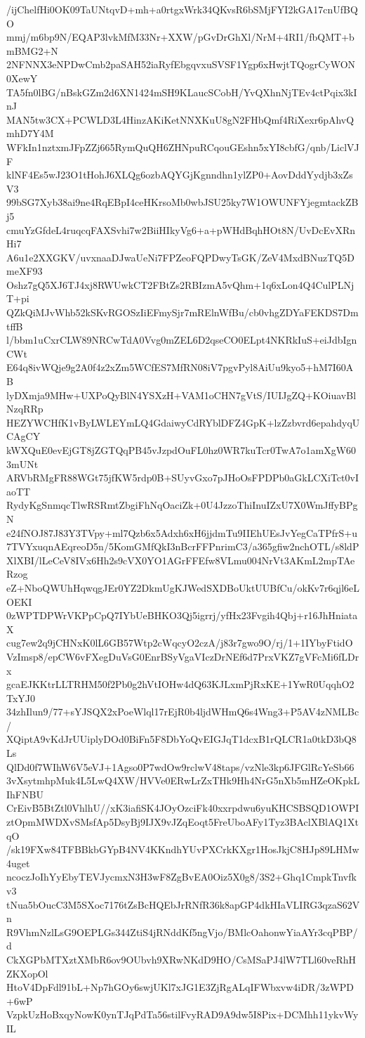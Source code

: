 /ijChelfHi0OK09TaUNtqvD+mh+a0rtgxWrk34QKvsR6bSMjFYI2kGA17cnUfBQO
mmj/m6bp9N/EQAP3lvkMfM33Nr+XXW/pGvDrGhXl/NrM+4RI1/fbQMT+bmBMG2+N
2NFNNX3eNPDwCmb2paSAH52iaRyfEbgqvxuSVSF1Ygp6xHwjtTQogrCyWON0XewY
TA5fn0lBG/nBskGZm2d6XN1424mSH9KLaucSCobH/YvQXhnNjTEv4ctPqix3kInJ
MAN5tw3CX+PCWLD3L4HinzAKiKetNNXKuU8gN2FHbQmf4RiXexr6pAhvQmhD7Y4M
WFkIn1nztxmJFpZZj665RymQuQH6ZHNpuRCqouGEshn5xYI8cbfG/qnb/LiclVJF
klNF4Es5wJ23O1tHohJ6XLQg6ozbAQYGjKgnndhn1ylZP0+AovDddYydjb3xZsV3
99bSG7Xyb38ai9ne4RqEBpI4ceHKrsoMb0wbJSU25ky7W1OWUNFYjegmtackZBj5
cmuYzGfdeL4ruqcqFAXSvhi7w2BiiHIkyVg6+a+pWHdBqhHOt8N/UvDcEvXRnHi7
A6u1e2XXGKV/uvxnaaDJwaUeNi7FPZeoFQPDwyTsGK/ZeV4MxdBNuzTQ5DmeXF93
Oshz7gQ5XJ6TJ4xj8RWUwkCT2FBtZs2RBIzmA5vQhm+1q6xLon4Q4CulPLNjT+pi
QZkQiMJvWhb52kSKvRGOSzIiEFmySjr7mRElnWfBu/cb0vhgZDYaFEKDS7DmtffB
l/bbm1uCxrCLW89NRCwTdA0Vvg0mZEL6D2qseCO0ELpt4NKRkIuS+eiJdbIgnCWt
E64q8ivWQje9g2A0f4z2xZm5WCfES7MfRN08iV7pgvPyl8AiUu9kyo5+hM7I60AB
lyDXmja9MHw+UXPoQyBlN4YSXzH+VAM1oCHN7gVtS/IUIJgZQ+KOiuavBlNzqRRp
HEZYWCHfK1vByLWLEYmLQ4GdaiwyCdRYblDFZ4GpK+lzZzbvrd6epahdyqUCAgCY
kWXQuE0evEjGT8jZGTQqPB45vJzpdOuFL0hz0WR7kuTcr0TwA7o1amXgW603mUNt
ARVbRMgFR88WGt75jfKW5rdp0B+SUyvGxo7pJHoOsFPDPb0aGkLCXiTct0vIaoTT
RydyKgSnmqcTlwRSRmtZbgiFhNqOaciZk+0U4JzzoThiInuIZxU7X0WmJffyBPgN
e24fNOJ87J83Y3TVpy+ml7Qzb6x5Adxh6xH6jjdmTu9IIEhUEsJvYegCaTPfrS+u
7TVYxuqnAEqreoD5n/5KomGMfQkI3nBcrFFPnrimC3/a365gfiw2nchOTL/s8ldP
XlXBI/lLeCeV8IVx6Hh2s9cVX0YO1AGrFFEfw8VLmu004NrVt3AKmL2mpTAeRzog
eZ+NboQWUhHqwqgJEr0YZ2DkmUgKJWedSXDBoUktUUBfCu/okKv7r6qjl6eLOEKI
0zWPTDPWrVKPpCpQ7IYbUeBHKO3Qj5igrrj/yfHx23Fvgih4Qbj+r16JhHniataX
cug7ew2q9jCHNxK0lL6GB57Wtp2cWqcyO2czA/j83r7gwo9O/rj/1+1IYbyFtidO
VzImsp8/epCW6vFXegDuVsG0EnrBSyVgaVIczDrNEf6d7PrxVKZ7gVFcMi6fLDrx
gcaEJKKtrLLTRHM50f2Pb0g2hVtIOHw4dQ63KJLxmPjRxKE+1YwR0UqqhO2TxYJ0
34zhIlun9/77+sYJSQX2xPoeWlql17rEjR0b4ljdWHmQ6s4Wng3+P5AV4zNMLBc/
XQiptA9vKdJrUUiplyDOd0BiFn5F8DbYoQvEIGJqT1dcxB1rQLCR1a0tkD3bQ8Ls
QlDd0f7WIhW6V5eVJ+1Agso0P7wdOw9rclwV48taps/vzNle3kp6JFGlRcYeSb66
3vXsytmhpMuk4L5LwQ4XW/HVVe0ERwLrZxTHk9Hh4NrG5nXb5mHZeOKpkLIhFNBU
CrEivB5BtZtl0VhlhU//xK3iafiSK4JOyOzciFk40xxrpdwu6yuKHCSBSQD1OWPI
ztOpmMWDXvSMsfAp5DsyBj9IJX9vJZqEoqt5FreUboAFy1Tyz3BAclXBlAQ1XtqO
/sk19FXw84TFBBkbGYpB4NV4KKndhYUvPXCrkKXgr1HosJkjC8HJp89LHMw4uget
ncoczJoIhYyEbyTEVJycmxN3H3wF8ZgBvEA0Oiz5X0g8/3S2+Ghq1CmpkTnvfkv3
tNua5bOucC3M5SXoc7176tZsBcHQEbJrRNfR36k8apGP4dkHIaVLIRG3qzaS62Vn
R9VhmNzlLsG9OEPLGs344ZtiS4jRNddKf5ngVjo/BMlcOahonwYiaAYr3cqPBP/d
CkXGPbMTXztXMbR6ov9OUbvh9XRwNKdD9HO/CsMSaPJ4lW7TLl60veRhHZKXopOl
HtoV4DpFdl91bL+Np7hGOy6swjUKl7xJG1E3ZjRgALqIFWbxvw4iDR/3zWPD+6wP
VzpkUzHoBxqyNowK0ynTJqPdTa56stilFvyRAD9A9dw5I8Pix+DCMhh11ykvWyIL
